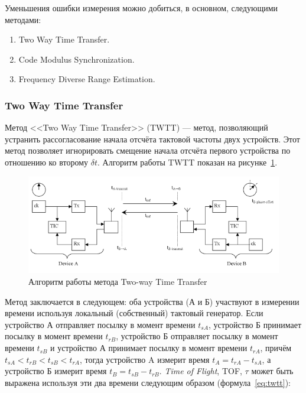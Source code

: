 Уменьшения ошибки измерения можно добиться, в основном, следующими методами:

\begin{enumerate}
    \item Two Way Time Transfer.
    \item Code Modulus Synchronization.
    \item Frequency Diverse Range Estimation.
\end{enumerate}

\subsubsection{Two Way Time Transfer}

Метод <<Two Way Time Transfer>> (TWTT) --- метод, позволяющий устранить рассогласование начала отсчёта тактовой частоты двух устройств. Этот метод позволяет игнорировать смещение начала отсчёта первого устройства по отношению ко второму $\delta t$. Алгоритм работы TWTT показан на рисунке~\ref{fig:twttmethod}.

\begin{figure}[ht]
    \includegraphics[width=1\linewidth]{Figures/twttmethod.png}
    \caption{Алгоритм работы метода Two-way Time Transfer}
    \label{fig:twttmethod}
\end{figure}

Метод заключается в следующем: оба устройства (А и Б) участвуют в измерении времени используя локальный (собственный) тактовый генератор. Если устройство А отправляет посылку в момент времени $t_{sA}$, устройство Б принимает посылку в момент времени $t_{rB}$, устройство Б отправляет посылку в момент времени $t_{sB}$ и устройство А принимает посылку в момент времени $t_{rA}$, причём $t_{sA} < t_{rB} < t_{sB} < t_{rA}$, тогда устройство A измерит время $t_A = t_{rA} - t_{sA}$, а устройство Б измерит время $t_B = t_{sB} - t_{rB}$. \textit{Time of Flight}, TOF, $\tau$ может быть выражена используя эти два времени следующим образом (формула~\eqref{eq:twtt}):

